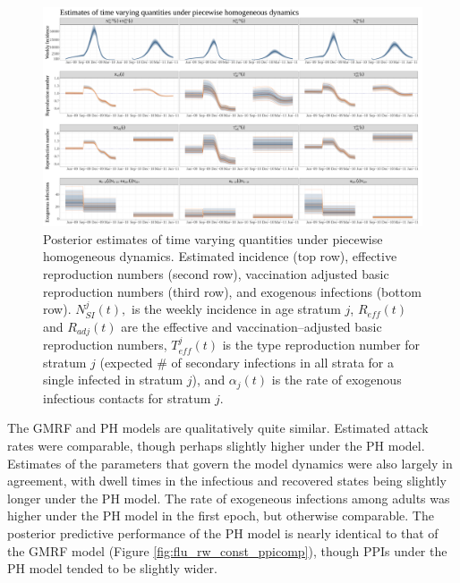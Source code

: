 \begin{figure}
	\centering
	\includegraphics[width=0.95\linewidth]{figures/flu_const_ode_timevarying_plots}
	\caption{Posterior estimates of time varying quantities under piecewise homogeneous dynamics. Estimated incidence (top row), effective reproduction numbers (second row), vaccination adjusted basic reproduction numbers (third row), and exogenous infections (bottom row). $ N_{SI}^j(t), $ is the weekly incidence in age stratum $ j $, $ R_{eff}(t) $ and $ R_{adj}(t) $ are the effective and vaccination--adjusted basic reproduction numbers, $ T_{eff}^j(t) $ is the type reproduction number for stratum $ j $ (expected \# of secondary infections in all strata for a single infected in stratum $ j $), and $ \alpha_j(t) $ is the rate of exogenous infectious contacts for stratum $ j $.}
	\label{fig:fluconstodetimevaryingplots}
\end{figure}


The GMRF and PH models are qualitatively quite similar. Estimated attack rates were comparable, though perhaps slightly higher under the PH model. Estimates of the parameters that govern the model dynamics were also largely in agreement, with dwell times in the infectious and recovered states being slightly longer under the PH model. The rate of exogeneous infections among adults was higher under the PH model in the first epoch, but otherwise comparable. The posterior predictive performance of the PH model is nearly identical to that of the GMRF model (Figure \ref{fig:flu_rw_const_ppicomp}), though PPIs under the PH model tended to be slightly wider. 


